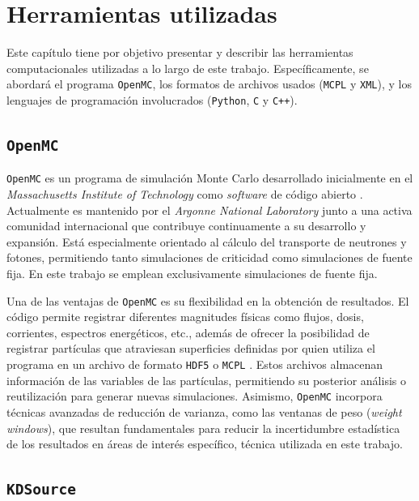 \chapter{Herramientas utilizadas}
\label{cap:herramientas}

Este capítulo tiene por objetivo presentar y describir las herramientas computacionales utilizadas a lo largo de este trabajo. Específicamente, se abordará el programa \texttt{OpenMC}, los formatos de archivos usados (\texttt{MCPL} y \texttt{XML}), y los lenguajes de programación involucrados (\texttt{Python}, \texttt{C} y \texttt{C++}).

\section{\texttt{OpenMC}}

\texttt{OpenMC} es un programa de simulación Monte Carlo desarrollado inicialmente en el \textit{Massachusetts Institute of Technology} como \textit{software} de código abierto \cite{OpenMC2024}. Actualmente es mantenido por el \textit{Argonne National Laboratory} junto a una activa comunidad internacional que contribuye continuamente a su desarrollo y expansión. Está especialmente orientado al cálculo del transporte de neutrones y fotones, permitiendo tanto simulaciones de criticidad como simulaciones de fuente fija. En este trabajo se emplean exclusivamente simulaciones de fuente fija.

Una de las ventajas de \texttt{OpenMC} es su flexibilidad en la obtención de resultados. El código permite registrar diferentes magnitudes físicas como flujos, dosis, corrientes, espectros energéticos, etc., además de ofrecer la posibilidad de registrar partículas que atraviesan superficies definidas por quien utiliza el programa en un archivo de formato \texttt{HDF5} \cite{HDF5_2025} o \texttt{MCPL} \cite{MCPL2024}. Estos archivos almacenan información de las variables de las partículas, permitiendo su posterior análisis o reutilización para generar nuevas simulaciones. Asimismo, \texttt{OpenMC} incorpora técnicas avanzadas de reducción de varianza, como las ventanas de peso (\textit{weight windows}), que resultan fundamentales para reducir la incertidumbre estadística de los resultados en áreas de interés específico, técnica utilizada en este trabajo.

\section{\texttt{KDSource}}



